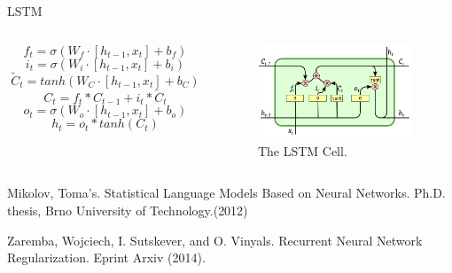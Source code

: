 \documentclass[aspectratio=169]{beamer} %
\begin{document}
    \begin{frame}{LSTM}
      \begin{columns}
      \begin{column}[t]{0.6\textwidth}
        \begin{equation}
           f_t = \sigma(W_f \cdot [h_{t-1}, x_t] + b_f)
        \end{equation}
        \begin{equation}
           i_t = \sigma(W_i \cdot [h_{t-1}, x_t] + b_i)
        \end{equation}
        \begin{equation}
           \tilde{C}_t = tanh(W_C \cdot [h_{t-1}, x_t] + b_C) 
        \end{equation}
        \begin{equation}
           C_t = f_t * C_{t-1} + i_t * \tilde{C}_t
        \end{equation}
        \begin{equation}
           o_t = \sigma(W_o \cdot [h_{t-1}, x_t] + b_o)
        \end{equation}
        \begin{equation}
           h_t = o_t * tanh(C_t)
        \end{equation}
      \end{column}

      \begin{column}[t]{0.4\textwidth}
        \begin{figure}
        \includegraphics[width=1.8in,height=1.1in]{lstm2.png}
        \caption{The LSTM Cell.}
        \end{figure}
      \end{column}

      \end{columns}
      \vspace*{2em}

      \tiny
      Mikolov, Toma's. Statistical Language Models Based on Neural Networks. Ph.D. thesis, Brno University of Technology.(2012)

      Zaremba, Wojciech, I. Sutskever, and O. Vinyals. Recurrent Neural Network Regularization. Eprint Arxiv (2014).
      
    \end{frame}
\end{document}
